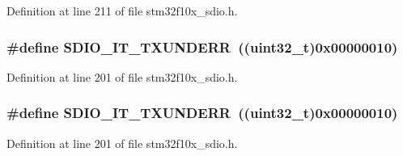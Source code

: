 Definition at line 211 of file stm32f10x\+\_\+sdio.\+h.

\subsubsection[{\texorpdfstring{S\+D\+I\+O\+\_\+\+I\+T\+\_\+\+T\+X\+U\+N\+D\+E\+RR}{SDIO_IT_TXUNDERR}}]{\setlength{\rightskip}{0pt plus 5cm}\#define S\+D\+I\+O\+\_\+\+I\+T\+\_\+\+T\+X\+U\+N\+D\+E\+RR~(({\bf uint32\+\_\+t})0x00000010)}\hypertarget{group___s_d_i_o___interrupt__sources_ga93d4dbe3162b8507b2834a3e29e6c648}{}\label{group___s_d_i_o___interrupt__sources_ga93d4dbe3162b8507b2834a3e29e6c648}


Definition at line 201 of file stm32f10x\+\_\+sdio.\+h.

\subsubsection[{\texorpdfstring{S\+D\+I\+O\+\_\+\+I\+T\+\_\+\+T\+X\+U\+N\+D\+E\+RR}{SDIO_IT_TXUNDERR}}]{\setlength{\rightskip}{0pt plus 5cm}\#define S\+D\+I\+O\+\_\+\+I\+T\+\_\+\+T\+X\+U\+N\+D\+E\+RR~(({\bf uint32\+\_\+t})0x00000010)}\hypertarget{group___s_d_i_o___interrupt__sources_ga93d4dbe3162b8507b2834a3e29e6c648}{}\label{group___s_d_i_o___interrupt__sources_ga93d4dbe3162b8507b2834a3e29e6c648}


Definition at line 201 of file stm32f10x\+\_\+sdio.\+h.

